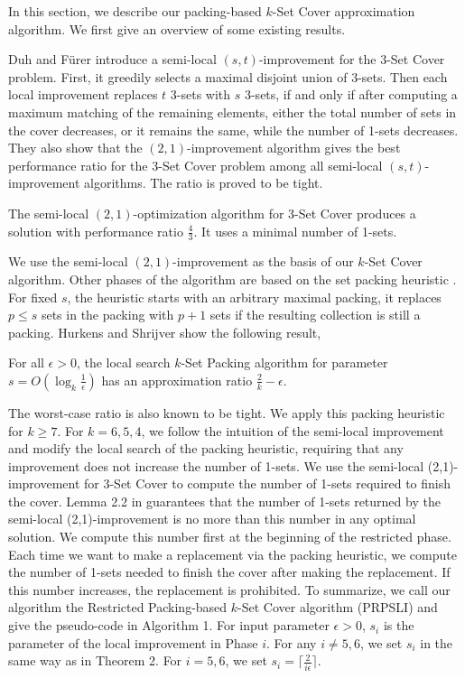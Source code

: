 \documentclass[runningheads,a4paper]{llncs}
\numberwithin{equation}{section}
\begin{document}
In this section, we describe our packing-based $k$-Set Cover approximation algorithm. We first give an overview of some existing results.

Duh and F\"{u}rer \cite{furer} introduce a semi-local $(s,t)$-improvement for the 3-Set Cover problem. First, it greedily selects a maximal disjoint union of 3-sets. Then each local improvement replaces $t$ 3-sets with $s$ 3-sets, if and only if after computing a maximum matching of the remaining elements, either the total number of sets in the cover decreases, or it remains the same, while the number of 1-sets decreases. They also show that the $(2,1)$-improvement algorithm gives the best performance ratio for the $3$-Set Cover problem among all semi-local $(s,t)$-improvement algorithms. The ratio is proved to be tight.

\begin{theorem}
The semi-local $(2,1)$-optimization algorithm for 3-Set Cover produces a solution with performance ratio $\frac{4}{3}$. It uses a minimal number of 1-sets.
\end{theorem}

We use the semi-local $(2,1)$-improvement as the basis of our $k$-Set Cover algorithm. Other phases of the algorithm are based on the set packing heuristic \cite{schrijver}. For fixed $s$, the heuristic starts with an arbitrary maximal packing, it replaces $p\leq s$ sets in the packing with $p+1$ sets if the resulting collection is still a packing. Hurkens and Shrijver \cite{schrijver} show the following result,

\begin{theorem}
For all $\epsilon>0$, the local search $k$-Set Packing algorithm for parameter $s=O(\log_k \frac{1}{\epsilon})$ has an approximation ratio $\frac{2}{k}-\epsilon$.
\end{theorem}

The worst-case ratio is also known to be tight. We apply this packing heuristic for $k\geq 7$. For $k=6,5,4$, we follow the intuition of the semi-local improvement and modify the local search of the packing heuristic, requiring that any improvement does not increase the number of 1-sets. We use the semi-local (2,1)-improvement for 3-Set Cover to compute the number of 1-sets required to finish the cover. Lemma 2.2 in \cite{furer} guarantees that the number of 1-sets returned by the semi-local (2,1)-improvement is no more than this number in any optimal solution. We compute this number first at the beginning of the restricted phase. Each time we want to make a replacement via the packing heuristic, we compute the number of 1-sets needed to finish the cover after making the replacement. If this number increases, the replacement is prohibited. To summarize, we call our algorithm the Restricted Packing-based $k$-Set Cover algorithm (PRPSLI) and give the pseudo-code in Algorithm 1. For input parameter $\epsilon>0$, $s_i$ is the parameter of the local improvement in Phase $i$. For any $i\neq 5,6$, we set $s_i$ in the same way as in Theorem 2. For $i=5,6$, we set $s_i=\lceil\frac{2}{i\epsilon}\rceil$.
\end{document}
